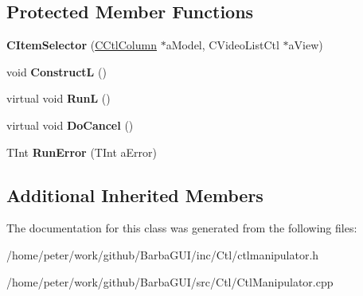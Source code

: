 \subsection*{Protected Member Functions}
\begin{DoxyCompactItemize}
\item 
\mbox{\label{classCItemSelector_a662af13a442c31bbafbfcea50fc58d09}} 
{\bfseries C\+Item\+Selector} (\hyperlink{classCCtlColumn}{C\+Ctl\+Column} $\ast$a\+Model, C\+Video\+List\+Ctl $\ast$a\+View)
\item 
\mbox{\label{classCItemSelector_aab7aa8877ccc041e2b7af3de428c17ad}} 
void {\bfseries ConstructL} ()
\item 
\mbox{\label{classCItemSelector_adc6218d680c13c924cc00ea571b6631a}} 
virtual void {\bfseries RunL} ()
\item 
\mbox{\label{classCItemSelector_af17d0d5ca2f81d8e98a2e1d1dca1bfc0}} 
virtual void {\bfseries Do\+Cancel} ()
\item 
\mbox{\label{classCItemSelector_ab91276eae71ea1757c47b1879728d2c1}} 
T\+Int {\bfseries Run\+Error} (T\+Int a\+Error)
\end{DoxyCompactItemize}
\subsection*{Additional Inherited Members}


The documentation for this class was generated from the following files\+:\begin{DoxyCompactItemize}
\item 
/home/peter/work/github/\+Barba\+G\+U\+I/inc/\+Ctl/ctlmanipulator.\+h\item 
/home/peter/work/github/\+Barba\+G\+U\+I/src/\+Ctl/Ctl\+Manipulator.\+cpp\end{DoxyCompactItemize}
